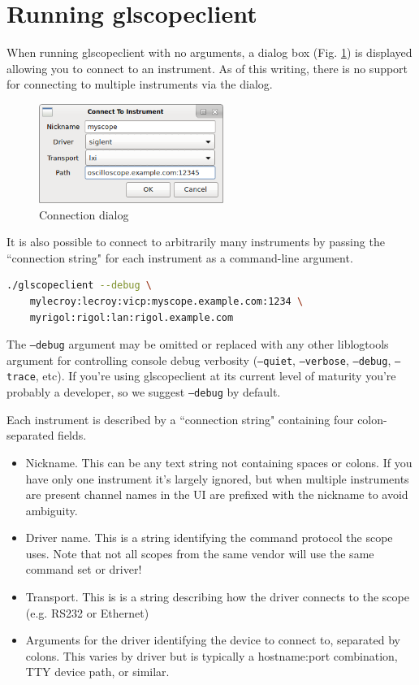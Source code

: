\section{Running glscopeclient}

When running glscopeclient with no arguments, a dialog box (Fig. \ref{connection-dialog}) is displayed allowing you to
connect to an instrument. As of this writing, there is no support for connecting to multiple instruments via the
dialog.

\begin{figure}[h]
\centering
\includegraphics[width=6cm]{images/connection-dialog.png}
\caption{Connection dialog}
\label{connection-dialog}
\end{figure}

It is also possible to connect to arbitrarily many instruments by passing the ``connection string" for each instrument
as a command-line argument.

\begin{lstlisting}[language=sh]
./glscopeclient --debug \
	mylecroy:lecroy:vicp:myscope.example.com:1234 \
	myrigol:rigol:lan:rigol.example.com
\end{lstlisting}

The \texttt{--debug} argument may be omitted or replaced with any other liblogtools argument for controlling console
debug verbosity (\texttt{--quiet}, \texttt{--verbose}, \texttt{--debug}, \texttt{--trace}, etc). If you're using
glscopeclient at its current level of maturity you're probably a developer, so we suggest \texttt{--debug} by default.

Each instrument is described by a ``connection string" containing four colon-separated fields.

\begin{itemize}
\item Nickname. This can be any text string not containing spaces or colons. If you have only one instrument it's
largely ignored, but when multiple instruments are present channel names in the UI are prefixed with the nickname to
avoid ambiguity.
\item Driver name. This is a string identifying the command protocol the scope uses. Note that not all
scopes from the same vendor will use the same command set or driver!
\item Transport. This is is a string describing how the driver connects to the scope (e.g. RS232 or Ethernet)
\item Arguments for the driver identifying the device to connect to, separated by colons. This varies by driver but is
typically a hostname:port combination, TTY device path, or similar.
\end{itemize}

